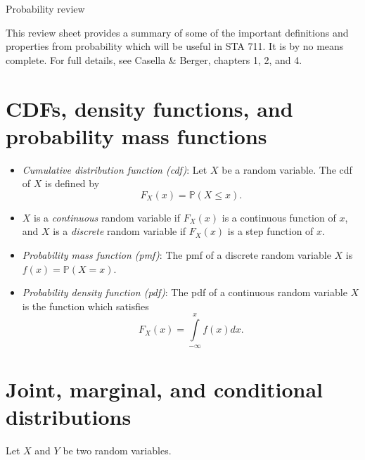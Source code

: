 \documentclass[11pt]{article}
\begin{document}
\begin{center}
\Large
Probability review\\
\normalsize
\vspace{5mm}
\end{center}

\noindent This review sheet provides a summary of some of the important definitions and properties from probability which will be useful in STA 711. It is by no means complete. For full details, see Casella \& Berger, chapters 1, 2, and 4.

\section*{CDFs, density functions, and probability mass functions}

\begin{itemize}
\item \textit{Cumulative distribution function (cdf)}: Let $X$ be a random variable. The cdf of $X$ is defined by 
$$F_X(x) = \mathbb{P}(X \leq x).$$

\item $X$ is a \textit{continuous} random variable if $F_X(x)$ is a continuous function of $x$, and $X$ is a \textit{discrete} random variable if $F_X(x)$ is a step function of $x$.

\item \textit{Probability mass function (pmf)}: The pmf of a discrete random variable $X$ is $f(x) = \mathbb{P}(X = x)$.

\item \textit{Probability density function (pdf)}: The pdf of a continuous random variable $X$ is the function which satisfies
$$F_X(x) = \int \limits_{-\infty}^x f(x) dx.$$
\end{itemize}

\section*{Joint, marginal, and conditional distributions}

Let $X$ and $Y$ be two random variables.
\end{document}
